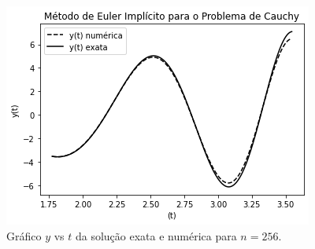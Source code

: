 \documentclass[amsmath,amssymb,floatfix]{revtex4}
\begin{document}
\begin{figure}[H]
\centering
\includegraphics[scale=0.56]{imply_num_exata}
\caption{Gráfico $y$ vs $t$ da solução exata e numérica para $n=256$.}
\label{imply}
\end{figure}
\end{document}
